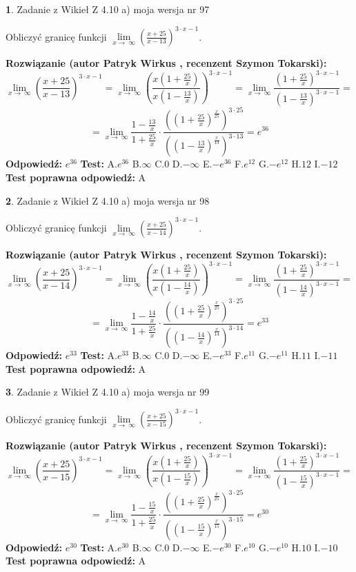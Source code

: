 \documentclass[12pt, a4paper]{article}
\theoremstyle{definition} %
\newtheorem{zad}{}
\newcommand{\zadStart}[1]{\begin{zad}#1\newline}
\newcommand{\zadStop}{\end{zad}}
\newcommand{\rozwStart}[2]{\noindent \textbf{Rozwiązanie (autor #1 , recenzent #2): }\newline}
\newcommand{\rozwStop}{\newline}
\newcommand{\odpStart}{\noindent \textbf{Odpowiedź:}\newline}
\newcommand{\odpStop}{\newline}
\newcommand{\testStart}{\noindent \textbf{Test:}\newline}
\newcommand{\testStop}{\newline}
\newcommand{\kluczStart}{\noindent \textbf{Test poprawna odpowiedź:}\newline}
\newcommand{\kluczStop}{\newline}
\begin{document}
\zadStart{Zadanie z Wikieł Z 4.10 a) moja wersja nr 97}

Obliczyć granicę funkcji  $\lim\limits_{x\to\ \infty}(\frac{x+25}{x-13})^{3\cdot x-1}$.
\zadStop
\rozwStart{Patryk Wirkus}{Szymon Tokarski}
$$\lim\limits_{x\to\ \infty}(\frac{x+25}{x-13})^{3\cdot x-1} = \lim\limits_{x\to\ \infty}(\frac{x(1+\frac{25}{x})}{x(1-\frac{13}{x})})^{3\cdot x-1}=\lim\limits_{x\to\ \infty}\frac{(1+\frac{25}{x})^{3\cdot x-1}}{(1-\frac{13}{x})^{3\cdot x-1}}=$$
$$=\lim\limits_{x\to\ \infty}\frac{1-\frac{13}{x}}{1+\frac{25}{x}}\cdot\frac{((1+\frac{25}{x})^{\frac{x}{25}})^{3\cdot25}}{((1-\frac{13}{x})^{\frac{x}{13}})^{3\cdot13}}=e^{36}$$
\rozwStop
\odpStart
$e^{36}$
\odpStop
\testStart
A.$e^{36}$ B.$\infty$ C.$0$ D.$-\infty$ E.$-e^{36}$
F.$e^{12}$ G.$-e^{12}$
H.$12$
I.$-12$
\testStop
\kluczStart
A
\kluczStop



\zadStart{Zadanie z Wikieł Z 4.10 a) moja wersja nr 98}

Obliczyć granicę funkcji  $\lim\limits_{x\to\ \infty}(\frac{x+25}{x-14})^{3\cdot x-1}$.
\zadStop
\rozwStart{Patryk Wirkus}{Szymon Tokarski}
$$\lim\limits_{x\to\ \infty}(\frac{x+25}{x-14})^{3\cdot x-1} = \lim\limits_{x\to\ \infty}(\frac{x(1+\frac{25}{x})}{x(1-\frac{14}{x})})^{3\cdot x-1}=\lim\limits_{x\to\ \infty}\frac{(1+\frac{25}{x})^{3\cdot x-1}}{(1-\frac{14}{x})^{3\cdot x-1}}=$$
$$=\lim\limits_{x\to\ \infty}\frac{1-\frac{14}{x}}{1+\frac{25}{x}}\cdot\frac{((1+\frac{25}{x})^{\frac{x}{25}})^{3\cdot25}}{((1-\frac{14}{x})^{\frac{x}{14}})^{3\cdot14}}=e^{33}$$
\rozwStop
\odpStart
$e^{33}$
\odpStop
\testStart
A.$e^{33}$ B.$\infty$ C.$0$ D.$-\infty$ E.$-e^{33}$
F.$e^{11}$ G.$-e^{11}$
H.$11$
I.$-11$
\testStop
\kluczStart
A
\kluczStop



\zadStart{Zadanie z Wikieł Z 4.10 a) moja wersja nr 99}

Obliczyć granicę funkcji  $\lim\limits_{x\to\ \infty}(\frac{x+25}{x-15})^{3\cdot x-1}$.
\zadStop
\rozwStart{Patryk Wirkus}{Szymon Tokarski}
$$\lim\limits_{x\to\ \infty}(\frac{x+25}{x-15})^{3\cdot x-1} = \lim\limits_{x\to\ \infty}(\frac{x(1+\frac{25}{x})}{x(1-\frac{15}{x})})^{3\cdot x-1}=\lim\limits_{x\to\ \infty}\frac{(1+\frac{25}{x})^{3\cdot x-1}}{(1-\frac{15}{x})^{3\cdot x-1}}=$$
$$=\lim\limits_{x\to\ \infty}\frac{1-\frac{15}{x}}{1+\frac{25}{x}}\cdot\frac{((1+\frac{25}{x})^{\frac{x}{25}})^{3\cdot25}}{((1-\frac{15}{x})^{\frac{x}{15}})^{3\cdot15}}=e^{30}$$
\rozwStop
\odpStart
$e^{30}$
\odpStop
\testStart
A.$e^{30}$ B.$\infty$ C.$0$ D.$-\infty$ E.$-e^{30}$
F.$e^{10}$ G.$-e^{10}$
H.$10$
I.$-10$
\testStop
\kluczStart
A
\kluczStop
\end{document}
